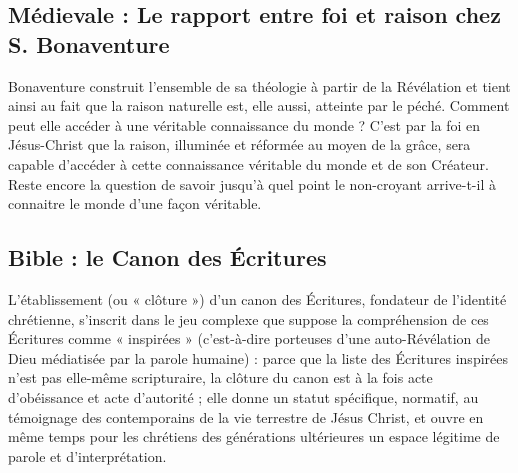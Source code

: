 \subsection{Médievale : Le rapport entre foi et raison chez S. Bonaventure}

Bonaventure construit l’ensemble de sa théologie à partir de la Révélation et tient ainsi au fait que la raison naturelle est, elle aussi, atteinte par le péché. Comment peut elle accéder à une véritable connaissance du monde ? C’est par la foi en Jésus-Christ que la raison, illuminée et réformée au moyen de la grâce, sera capable d’accéder à cette connaissance véritable du monde et de son Créateur. Reste encore la question de savoir jusqu’à quel point le non-croyant arrive-t-il à connaitre le monde d’une façon véritable.\\

\begin{references}


\end{references}

\subsection{Bible : le Canon des Écritures}

L'établissement (ou « clôture ») d'un canon des Écritures, fondateur de l'identité chrétienne, s'inscrit dans le jeu complexe que suppose la compréhension de ces Écritures comme « inspirées » (c'est-à-dire porteuses d'une auto-Révélation de Dieu médiatisée par la parole humaine) : parce que la liste des Écritures inspirées n'est pas elle-même scripturaire, la clôture du canon est à la fois acte d'obéissance et acte d'autorité ; elle donne un statut spécifique, normatif, au témoignage des contemporains de la vie terrestre de Jésus Christ, et ouvre en même temps pour les chrétiens des générations ultérieures un espace légitime de parole et d'interprétation.\\

\begin{references}




\end{references}




